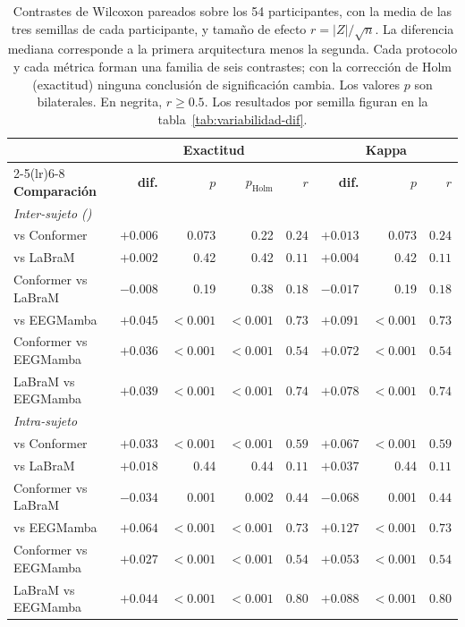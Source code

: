 \begin{table}[H]
\centering
\caption{Contrastes de Wilcoxon pareados sobre los 54 participantes, con la media de las tres
semillas de cada participante, y tamaño de efecto $r = |Z|/\sqrt{n}$. La diferencia
mediana corresponde a la primera arquitectura menos la segunda. Cada protocolo y cada métrica
forman una familia de seis contrastes; con la corrección de Holm (exactitud) ninguna conclusión de
significación cambia. Los valores $p$ son bilaterales. En negrita, $r \geq 0.5$. Los resultados por
semilla figuran en la tabla~\ref{tab:variabilidad-dif}.}
\label{tab:wilcoxon}
\small
\begin{tabular}{lrrrrrrr}
\toprule
& \multicolumn{4}{c}{\textbf{Exactitud}} & \multicolumn{3}{c}{\textbf{Kappa}} \\
\cmidrule(lr){2-5}\cmidrule(lr){6-8}
\textbf{Comparación} & \textbf{dif.} & $p$ & $p_{\text{Holm}}$ & $r$ & \textbf{dif.} & $p$ & $r$ \\
\midrule
\multicolumn{8}{l}{\textit{Inter-sujeto (\loso{})}} \\
\eegnet{} vs Conformer & $+0.006$ & 0.073 & 0.22 & $0.24$ & $+0.013$ & 0.073 & $0.24$ \\
\eegnet{} vs LaBraM & $+0.002$ & 0.42 & 0.42 & $0.11$ & $+0.004$ & 0.42 & $0.11$ \\
Conformer vs LaBraM & $-0.008$ & 0.19 & 0.38 & $0.18$ & $-0.017$ & 0.19 & $0.18$ \\
\eegnet{} vs EEGMamba & $+0.045$ & $<0.001$ & $<0.001$ & $\mathbf{0.73}$ & $+0.091$ & $<0.001$ & $\mathbf{0.73}$ \\
Conformer vs EEGMamba & $+0.036$ & $<0.001$ & $<0.001$ & $\mathbf{0.54}$ & $+0.072$ & $<0.001$ & $\mathbf{0.54}$ \\
LaBraM vs EEGMamba & $+0.039$ & $<0.001$ & $<0.001$ & $\mathbf{0.74}$ & $+0.078$ & $<0.001$ & $\mathbf{0.74}$ \\
\midrule
\multicolumn{8}{l}{\textit{Intra-sujeto}} \\
\eegnet{} vs Conformer & $+0.033$ & $<0.001$ & $<0.001$ & $\mathbf{0.59}$ & $+0.067$ & $<0.001$ & $\mathbf{0.59}$ \\
\eegnet{} vs LaBraM & $+0.018$ & 0.44 & 0.44 & $0.11$ & $+0.037$ & 0.44 & $0.11$ \\
Conformer vs LaBraM & $-0.034$ & 0.001 & 0.002 & $0.44$ & $-0.068$ & 0.001 & $0.44$ \\
\eegnet{} vs EEGMamba & $+0.064$ & $<0.001$ & $<0.001$ & $\mathbf{0.73}$ & $+0.127$ & $<0.001$ & $\mathbf{0.73}$ \\
Conformer vs EEGMamba & $+0.027$ & $<0.001$ & $<0.001$ & $\mathbf{0.54}$ & $+0.053$ & $<0.001$ & $\mathbf{0.54}$ \\
LaBraM vs EEGMamba & $+0.044$ & $<0.001$ & $<0.001$ & $\mathbf{0.80}$ & $+0.088$ & $<0.001$ & $\mathbf{0.80}$ \\
\bottomrule
\end{tabular}
\end{table}


